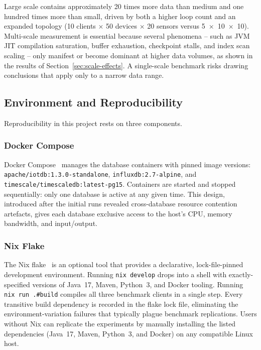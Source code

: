 Large scale contains approximately 20 times more data than medium and one hundred times more
than small, driven by both a higher loop count and an expanded topology (10 clients
$\times$ 50 devices $\times$ 20 sensors versus 5~$\times$~10~$\times$~10). Multi-scale
measurement is essential because several phenomena -- such as JVM JIT compilation
saturation, buffer exhaustion, checkpoint stalls, and index scan scaling -- only
manifest or become dominant at higher data volumes, as shown in the results of Section~\ref{sec:scale-effects}. A single-scale benchmark risks drawing
conclusions that apply only to a narrow data range.

\subsection{Environment and Reproducibility}
\label{sec:infrastructure}

Reproducibility in this project rests on three components.

\subsubsection{Docker Compose}

Docker Compose~\cite{docker} manages the database containers with pinned image
versions: \texttt{apache/iotdb:1.3.0-standalone}, \texttt{influxdb:2.7-alpine}, and
\texttt{timescale/timescaledb:latest-pg15}. Containers are started and stopped
sequentially: only one database is active at any given time. This design, introduced
after the initial runs revealed cross-database resource contention artefacts, gives each
database exclusive access to the host's CPU, memory bandwidth, and input/output.

\subsubsection{Nix Flake}

The Nix flake~\cite{nixos} is an optional tool that provides a declarative,
lock-file-pinned development environment. Running \texttt{nix~develop} drops into a shell
with exactly-specified versions of Java~17, Maven, Python~3, and Docker tooling. Running
\texttt{nix~run~.\#build} compiles all three benchmark clients in a single step. Every
transitive build dependency is recorded in the flake lock file, eliminating the
environment-variation failures that typically plague benchmark replications. Users without
Nix can replicate the experiments by manually installing the listed dependencies (Java~17,
Maven, Python~3, and Docker) on any compatible Linux host.

